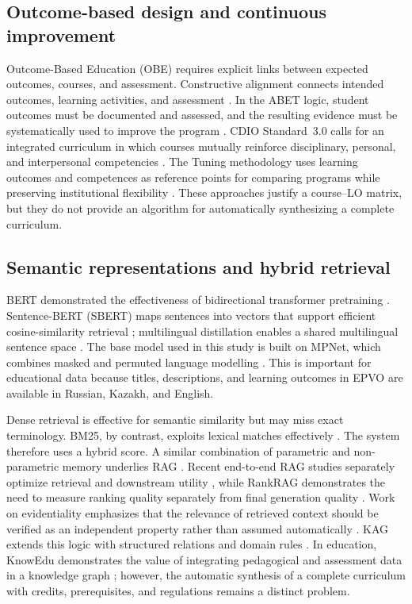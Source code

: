 \documentclass[twoside,11pt]{article}
\begin{document}
\subsection{Outcome-based design and continuous improvement}

Outcome-Based Education (OBE) requires explicit links between expected outcomes, courses, and assessment. Constructive alignment connects intended outcomes, learning activities, and assessment \cite{Biggs1996}. In the ABET logic, student outcomes must be documented and assessed, and the resulting evidence must be systematically used to improve the program \cite{ABET2025}. CDIO Standard~3.0 calls for an integrated curriculum in which courses mutually reinforce disciplinary, personal, and interpersonal competencies \cite{CDIO2022}. The Tuning methodology uses learning outcomes and competences as reference points for comparing programs while preserving institutional flexibility \cite{Tuning2003}. These approaches justify a course--LO matrix, but they do not provide an algorithm for automatically synthesizing a complete curriculum.

\subsection{Semantic representations and hybrid retrieval}

BERT demonstrated the effectiveness of bidirectional transformer pretraining \cite{Devlin2019}. Sentence-BERT (SBERT) maps sentences into vectors that support efficient cosine-similarity retrieval \cite{Reimers2019}; multilingual distillation enables a shared multilingual sentence space \cite{Reimers2020}. The base model used in this study is built on MPNet, which combines masked and permuted language modelling \cite{Song2020}. This is important for educational data because titles, descriptions, and learning outcomes in EPVO are available in Russian, Kazakh, and English.

Dense retrieval is effective for semantic similarity but may miss exact terminology. BM25, by contrast, exploits lexical matches effectively \cite{Robertson2009}. The system therefore uses a hybrid score. A similar combination of parametric and non-parametric memory underlies RAG \cite{Lewis2020}. Recent end-to-end RAG studies separately optimize retrieval and downstream utility \cite{Zamani2024}, while RankRAG demonstrates the need to measure ranking quality separately from final generation quality \cite{Yu2024RankRAG}. Work on evidentiality emphasizes that the relevance of retrieved context should be verified as an independent property rather than assumed automatically \cite{Asai2022}. KAG extends this logic with structured relations and domain rules \cite{Liang2024}. In education, KnowEdu demonstrates the value of integrating pedagogical and assessment data in a knowledge graph \cite{Chen2018KnowEdu}; however, the automatic synthesis of a complete curriculum with credits, prerequisites, and regulations remains a distinct problem.
\end{document}
